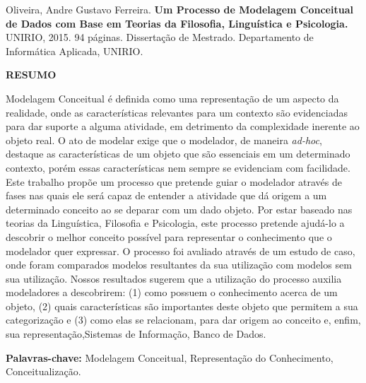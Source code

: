 Oliveira, Andre Gustavo Ferreira. \textbf{Um Processo de Modelagem Conceitual de Dados com Base em Teorias da Filosofia, Linguística e Psicologia.} UNIRIO, 2015. 94 páginas. Dissertação de Mestrado. Departamento de Informática Aplicada, UNIRIO.
\vspace{60pt}
\begin{center}
    \textbf{RESUMO}
    \vspace{60pt}
\end{center}

Modelagem Conceitual é definida como uma representação de um aspecto da realidade, onde as características relevantes para um contexto são evidenciadas para dar suporte a alguma atividade, em detrimento da complexidade inerente ao objeto real. O ato de modelar exige que o modelador, de maneira \textit{ad-hoc}, destaque as características de um objeto que são essenciais em um determinado contexto, porém essas características nem sempre se evidenciam com facilidade. Este trabalho propõe um processo que pretende guiar o modelador através de fases nas quais ele será capaz de entender a atividade que dá origem a um determinado conceito ao se deparar com um dado objeto. Por estar baseado nas teorias da Linguística, Filosofia e Psicologia, este processo pretende ajudá-lo a descobrir o melhor conceito possível para representar o conhecimento que o modelador quer expressar. O processo foi avaliado através de um estudo de caso, onde foram comparados modelos resultantes da sua utilização com modelos sem sua utilização. Nossos resultados sugerem que a utilização do processo auxilia modeladores a descobrirem: (1) como possuem o conhecimento acerca de um objeto, (2) quais características são importantes deste objeto que permitem a sua categorização e (3) como elas se relacionam, para dar origem ao conceito e, enfim, sua representação,Sistemas de Informação, Banco de Dados.

\vspace{20pt}

\textbf{Palavras-chave:} Modelagem Conceitual, Representação do Conhecimento, Conceitualização.
